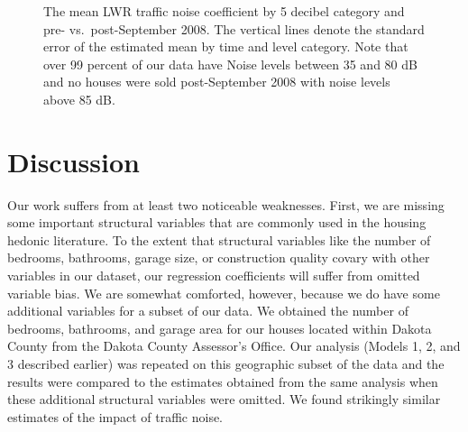 \documentclass{article}\usepackage{graphicx, color}
\begin{document}
\begin{figure}
\caption{The mean LWR traffic noise coefficient by 5 decibel category and pre- vs.\ post-September 2008. The vertical lines denote the standard error of the estimated mean by time and level category. Note that over 99 percent of our data have Noise levels between 35 and 80 dB and no houses were sold post-September 2008 with noise levels above 85 dB.}\label{fig:betaMAXvCat}
\end{figure}


\section{Discussion}\label{Discussion}

Our work suffers from at least two noticeable weaknesses. First, we are missing some important structural variables that are commonly used in the housing hedonic literature. To the extent that structural variables like the number of bedrooms, bathrooms, garage size, or construction quality covary with other variables in our dataset, our regression coefficients will suffer from omitted variable bias. We are somewhat comforted, however, because we do have some additional variables for a subset of our data. We obtained the number of bedrooms, bathrooms, and garage area for our houses located within Dakota County from the Dakota County Assessor's Office. Our analysis (Models 1, 2, and 3 described earlier) was repeated on this geographic subset of the data and the results were compared to the estimates obtained from the same analysis when these additional structural variables were omitted. We found strikingly similar estimates of the impact of traffic noise.
\end{document}
